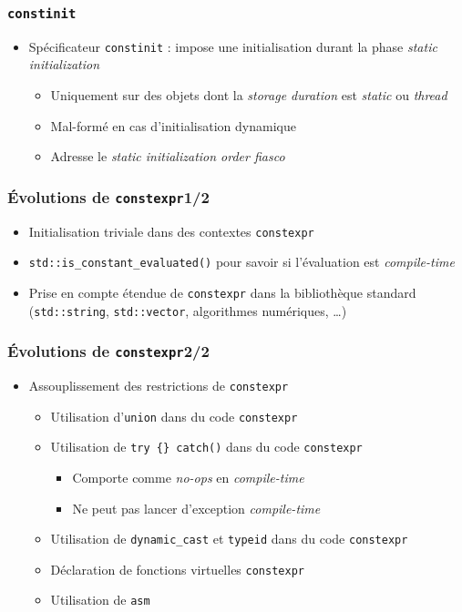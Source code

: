 \documentclass[C++.tex]{subfiles}
\begin{document}
\begin{frame}[fragile]
	\frametitle{\lstinline|constinit|}
	\begin{itemize}
		\item Spécificateur \lstinline|constinit| : impose une initialisation durant la phase \textit{static initialization}
		\begin{itemize}
			\item Uniquement sur des objets dont la \textit{storage duration} est \textit{static} ou \textit{thread}
			\item Mal-formé en cas d'initialisation dynamique
			\item Adresse le \textit{static initialization order fiasco}
		\end{itemize}
	\end{itemize}
\end{frame}

\begin{frame}[fragile]
	\frametitle{Évolutions de \lstinline|constexpr|\titlehfill{}1/2}
	\begin{itemize}
		\item Initialisation triviale dans des contextes \lstinline|constexpr|
		\item \lstinline|std::is_constant_evaluated()| pour savoir si l'évaluation est \textit{compile-time}
		\item Prise en compte étendue de \lstinline|constexpr| dans la bibliothèque standard (\lstinline|std::string|, \lstinline|std::vector|, algorithmes numériques, \ldots)
	\end{itemize}
\end{frame}

\begin{frame}[fragile]
	\frametitle{Évolutions de \lstinline|constexpr|\titlehfill{}2/2}
	\begin{itemize}
		\item Assouplissement des restrictions de \lstinline|constexpr|
		\begin{itemize}
			\item Utilisation d'\lstinline|union| dans du code \lstinline|constexpr|
			\item Utilisation de \lstinline|try {} catch()| dans du code \lstinline|constexpr|
			\begin{itemize}
				\item Comporte comme \textit{no-ops} en \textit{compile-time}
				\item Ne peut pas lancer d'exception \textit{compile-time}
			\end{itemize}
			\item Utilisation de \lstinline|dynamic_cast| et \lstinline|typeid| dans du code \lstinline|constexpr|
			\item Déclaration de fonctions virtuelles \lstinline|constexpr|
			\item Utilisation de \lstinline|asm|
		\end{itemize}
	\end{itemize}
\end{frame}
\end{document}
